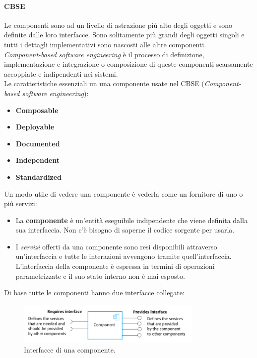 	 	 	\paragraph{CBSE}
	 	 	Le componenti sono ad un livello di astrazione più alto degli oggetti e sono definite dalle loro interfacce. Sono solitamente più grandi degli oggetti singoli e tutti i dettagli implementativi sono nascosti alle altre componenti. \\
	 		\textit{Component-based software engineering} è il processo di definizione, implementazione e integrazione o composizione di queste componenti scarsamente accoppiate e indipendenti nei sistemi.  \\
	 		Le caratteristiche essenziali un una componente usate nel CBSE (\textit{Component-based software engineering}):
	 		\begin{itemize}
	 			\item \textbf{Composable}
	 			\item \textbf{Deployable}
	 			\item \textbf{Documented}
	 			\item \textbf{Independent}
	 			\item \textbf{Standardized}
	 		\end{itemize}
 			Un modo utile di vedere una componente è vederla come un fornitore di uno o più servizi:
 			\begin{itemize}
 				\item La \textbf{componente} è un'entità eseguibile indipendente che viene definita dalla sua interfaccia. Non c'è bisogno di saperne il codice sorgente per usarla.
 				\item I \textit{servizi} offerti da una componente sono resi disponibili attraverso un'interfaccia e tutte le interazioni avvengono tramite quell'interfaccia. L'interfaccia della componente è espressa in termini di operazioni parametrizzate e il suo stato interno non è mai esposto.
 			\end{itemize}
 			Di base tutte le componenti hanno due interfacce collegate:

 			\begin{figure}[H]
 				\centering
 				\includegraphics[width=0.8\textwidth]{img/interfaces}
 				\caption{Interfacce di una componente.}
 			\end{figure}

